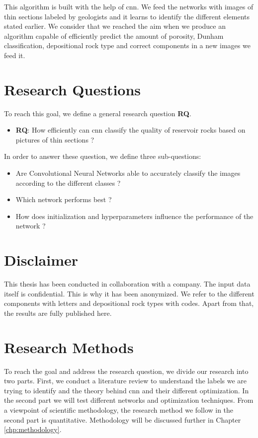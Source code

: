 This algorithm is built with the help of \gls{cnn}. We feed the networks with images of thin sections labeled by geologists and it learns to identify the different elements stated earlier. We consider that we reached the aim when we produce an algorithm capable of efficiently predict the amount of porosity, Dunham classification, depositional rock type and correct components in a new images we feed it. 

\section{Research Questions}
To reach this goal, we define a general research question \textbf{RQ}. 
\begin{itemize}
    \item \textbf{RQ}: How efficiently can \gls{cnn} classify the quality of reservoir rocks based on pictures of thin sections ?
\end{itemize}

In order to answer these question, we define three sub-questions: 
\begin{itemize}
    \item Are Convolutional Neural Networks able to accurately classify the images according to the different classes ?
    \item Which network performs best ?
    \item How does initialization and hyperparameters influence the performance of the network ?
\end{itemize}

\section{Disclaimer}
This thesis has been conducted in collaboration with a company. The input data itself is confidential. This is why it has been anonymized. We refer to the different components with letters and depositional rock types with codes. Apart from that, the results are fully published here.  

\section{Research Methods}\label{sec:research-method}
To reach the goal and address the research question, we divide our research into two parts. First, we conduct a literature review to understand the labels we are trying to identify and the theory behind \gls{cnn} and their different optimization. In the second part we will test different networks and optimization techniques. From a viewpoint of scientific methodology, the research method we follow in the second part is quantitative. Methodology will be discussed further in Chapter \ref{chp:methodology}.

